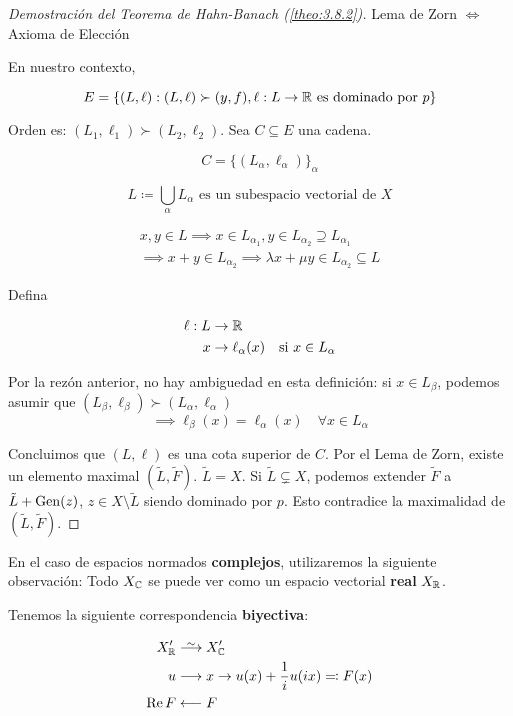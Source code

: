 \begin{proof}[Demostración del Teorema de Hahn-Banach (\ref{theo:3.8.2})]
    Lema de Zorn $\iff$ Axioma de Elección

    En nuestro contexto, 

    \[E=\{(L, \ell):(L,\ell)\succ (y,f),\ell:L\to\mathbb{R} \text{ es dominado por }p\}\]

    Orden es: $(L_1,\ell_1)\succ (L_2,\ell_2)$. Sea $C\subseteq E$ una cadena.

    \[C=\{(L_\alpha,\ell_\alpha)\}_\alpha\]

    \[L\coloneqq\bigcup_{\alpha}L_\alpha\text{ es un subespacio vectorial de }X\]

    \begin{align*}
        x,y\in L\implies x\in L_{\alpha_1}, y\in L_{\alpha_2}\supseteq L_{\alpha_1}\\
        \implies x+y\in L_{\alpha_2}\implies \lambda x+\mu y\in L_{\alpha_2}\subseteq L
    \end{align*}

    Defina 

    \begin{align*}
        \ell:L&\to\mathbb{R}\\
        x&\to \ell_\alpha(x)\quad \text{si } x\in L_\alpha
    \end{align*}

    Por la rezón anterior, no hay ambiguedad en esta definición: si $x\in L_\beta$, podemos asumir que $(L_\beta,\ell_\beta)\succ (L_\alpha,\ell_\alpha)$
    \[\implies \ell_\beta(x)=\ell_\alpha(x)\quad \forall x\in L_\alpha\]

    Concluimos que $(L,\ell)$ es una cota superior de $C$. Por el Lema de Zorn, existe un elemento maximal $(\tilde L, \tilde F)$. $\tilde L=X$. Si $\tilde L\subsetneq X$, podemos extender $\tilde F$ a $\tilde L+\operatorname{Gen}(z)$, $z\in X\setminus \tilde L$ siendo dominado por $p$. Esto contradice la maximalidad de $(\tilde L,\tilde F)$.
\end{proof}

En el caso de espacios normados \textbf{complejos}, utilizaremos la siguiente observación: Todo $X_{\mathbb{C}}$ se puede ver como un espacio vectorial \textbf{real} $X_{\mathbb{R}}$.

Tenemos la siguiente correspondencia \textbf{biyectiva}:

\begin{align*}
    X_\R'&\stackrel{\sim}{\smash{\longrightarrow}\rule{0pt}{0.4ex}} X_\C'\\
    u&\longrightarrow x\to u(x)+\frac{1}{i}u(ix)\eqqcolon F(x)\\
    \Re F&\longleftarrow F
\end{align*}

